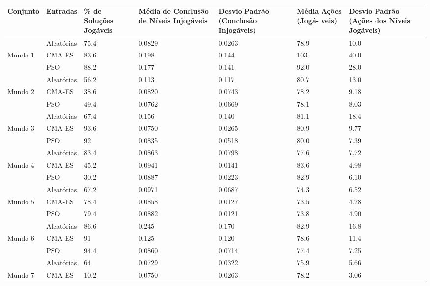 \begin{table}[ht]
    \centering
    \begin{tabular}{|p{2cm}|p{2cm}|p{2cm}|p{2cm}|p{2cm}|p{1cm}|p{2cm}|}
            \hline
        \textbf{Conjunto} & \textbf{Entradas} & \textbf{\% de Soluções Jogáveis} & \textbf{Média de Conclusão de Níveis Injogáveis} & \textbf{Desvio Padrão (Conclusão Injogáveis)} & \textbf{Média Ações (Jogá- veis)} & \textbf{Desvio Padrão (Ações dos Níveis Jogáveis)} \\
            \hline
        & Aleatórias & 75.4 & 0.0829 & 0.0263 & 78.9 & 10.0 \\
        Mundo 1 & CMA-ES & 83.6 & 0.198 & 0.144 & 103. & 40.0 \\
        & PSO & 88.2 & 0.177 & 0.141 & 92.0 & 28.0 \\
            \hline
        & Aleatórias & 56.2 & 0.113 & 0.117 & 80.7 & 13.0 \\
        Mundo 2 & CMA-ES & 38.6 & 0.0820 & 0.0743 & 78.2 & 9.18 \\
        & PSO & 49.4 & 0.0762 & 0.0669 & 78.1 & 8.03 \\
            \hline
        & Aleatórias & 67.4 & 0.156 & 0.140 & 81.1 & 18.4 \\
        Mundo 3 & CMA-ES & 93.6 & 0.0750 & 0.0265 & 80.9 & 9.77 \\
        & PSO & 92 & 0.0835 & 0.0518 & 80.0 & 7.39 \\
            \hline
        & Aleatórias & 83.4 & 0.0863 & 0.0798 & 77.6 & 7.72 \\
        Mundo 4 & CMA-ES & 45.2 & 0.0941 & 0.0141 & 83.6 & 4.98 \\
        & PSO & 30.2 & 0.0887 & 0.0223 & 82.9 & 6.10 \\
            \hline
        & Aleatórias & 67.2 & 0.0971 & 0.0687 & 74.3 & 6.52 \\
        Mundo 5 & CMA-ES & 78.4 & 0.0858 & 0.0127 & 73.5 & 4.28 \\
        & PSO & 79.4 & 0.0882 & 0.0121 & 73.8 & 4.90 \\
            \hline
        & Aleatórias & 86.6 & 0.245 & 0.170 & 82.9 & 16.8 \\
        Mundo 6 & CMA-ES & 91 & 0.125 & 0.120 & 78.6 & 11.4 \\
        & PSO & 94.4 & 0.0860 & 0.0714 & 77.4 & 7.25 \\
            \hline
       & Aleatórias & 64 & 0.0729 & 0.0322 & 75.9 & 5.66 \\
        Mundo 7 & CMA-ES & 10.2 & 0.0750 & 0.0263 & 78.2 & 3.06 \\

\end{tabular}
\end{table}
